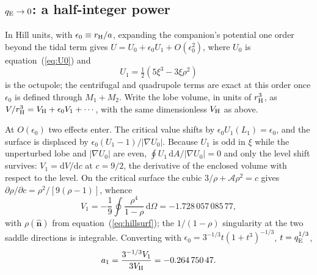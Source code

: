 \documentclass[twocolumn]{aastex702}
\newcommand{\qE}{q_{\rm E}}
\newcommand{\dd}{\mathrm{d}}
\begin{document}
\subsection{$\qE\to0$: a half-integer power}\label{sec:asym_hill}

In Hill units, with $\epsilon_0\equiv r_{\rm H}/a$, expanding the companion's potential one order beyond the tidal term gives $U=U_0+\epsilon_0 U_1+O(\epsilon_0^2)$, where $U_0$ is equation~(\ref{eq:U0}) and
\begin{equation}
U_1=\tfrac12\left(5\xi^3-3\xi\rho^2\right)
\end{equation}
is the octupole; the centrifugal and quadrupole terms are exact at this order once $\epsilon_0$ is defined through $M_1+M_2$. Write the lobe volume, in units of $r_{\rm H}^3$, as $V/r_{\rm H}^3=V_{\rm H}+\epsilon_0 V_1+\cdots$, with the same dimensionless $V_{\rm H}$ as above.

At $O(\epsilon_0)$ two effects enter. The critical value shifts by $\epsilon_0 U_1(L_1)=\epsilon_0$, and the surface is displaced by $\epsilon_0(U_1-1)/|\nabla U_0|$. Because $U_1$ is odd in $\xi$ while the unperturbed lobe and $|\nabla U_0|$ are even, $\oint U_1\,\dd A/|\nabla U_0|=0$ and only the level shift survives: $V_1=\dd V/\dd c$ at $c=9/2$, the derivative of the enclosed volume with respect to the level. On the critical surface the cubic $3/\rho+\mathcal A\rho^2=c$ gives $\partial\rho/\partial c=\rho^2/[9(\rho-1)]$, whence
\begin{equation}
V_1=-\frac19\oint\frac{\rho^4}{1-\rho}\,\dd\Omega=-1.728\,057\,085\,77,
\label{eq:V1}
\end{equation}
with $\rho(\hat{\bm n})$ from equation~(\ref{eq:hillsurf}); the $1/(1-\rho)$ singularity at the two saddle directions is integrable. Converting with $\epsilon_0=3^{-1/3}t(1+t^3)^{-1/3}$, $t=\qE^{1/3}$,
\begin{equation}
a_1=\frac{3^{-1/3}V_1}{3V_{\rm H}}=-0.264\,750\,47.
\end{equation}
\end{document}
